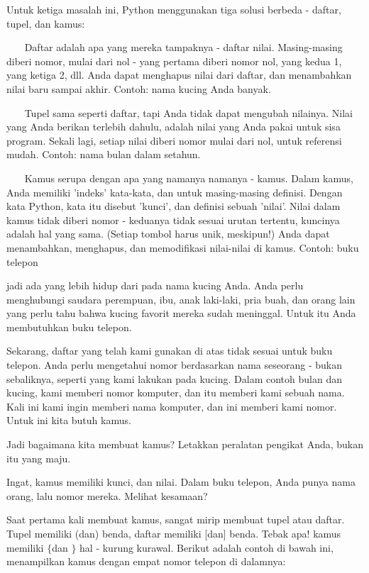 \vspace{12pt}
Untuk ketiga masalah ini, Python menggunakan tiga solusi berbeda - daftar, tupel, dan kamus: \par
\vspace{12pt}
~~~ Daftar adalah apa yang mereka tampaknya - daftar nilai. Masing-masing diberi nomor, mulai dari nol - yang pertama diberi nomor nol, yang kedua 1, yang ketiga 2, dll. Anda dapat menghapus nilai dari daftar, dan menambahkan nilai baru sampai akhir. Contoh: nama kucing Anda banyak. \par
~~~ Tupel sama seperti daftar, tapi Anda tidak dapat mengubah nilainya. Nilai yang Anda berikan terlebih dahulu, adalah nilai yang Anda pakai untuk sisa program. Sekali lagi, setiap nilai diberi nomor mulai dari nol, untuk referensi mudah. Contoh: nama bulan dalam setahun. \par
~~~ Kamus serupa dengan apa yang namanya namanya - kamus. Dalam kamus, Anda memiliki 'indeks' kata-kata, dan untuk masing-masing definisi. Dengan kata Python, kata itu disebut 'kunci', dan definisi sebuah 'nilai'. Nilai dalam kamus tidak diberi nomor - keduanya tidak sesuai urutan tertentu, kuncinya adalah hal yang sama. (Setiap tombol harus unik, meskipun!) Anda dapat menambahkan, menghapus, dan memodifikasi nilai-nilai di kamus. Contoh: buku telepon \par
jadi ada yang lebih hidup dari pada nama kucing Anda. Anda perlu menghubungi saudara perempuan, ibu, anak laki-laki, pria buah, dan orang lain yang perlu tahu bahwa kucing favorit mereka sudah meninggal. Untuk itu Anda membutuhkan buku telepon. \par
\vspace{12pt}
Sekarang, daftar yang telah kami gunakan di atas tidak sesuai untuk buku telepon. Anda perlu mengetahui nomor berdasarkan nama seseorang - bukan sebaliknya, seperti yang kami lakukan pada kucing. Dalam contoh bulan dan kucing, kami memberi nomor komputer, dan itu memberi kami sebuah nama. Kali ini kami ingin memberi nama komputer, dan ini memberi kami nomor. Untuk ini kita butuh kamus. \par
\vspace{12pt}
Jadi bagaimana kita membuat kamus? Letakkan peralatan pengikat Anda, bukan itu yang maju. \par
\vspace{12pt}
Ingat, kamus memiliki kunci, dan nilai. Dalam buku telepon, Anda punya nama orang, lalu nomor mereka. Melihat kesamaan? \par
\vspace{12pt}
Saat pertama kali membuat kamus, sangat mirip membuat tupel atau daftar. Tupel memiliki (dan) benda, daftar memiliki [dan] benda. Tebak apa! kamus memiliki  $  \{  $dan $  \}  $ hal - kurung kurawal. Berikut adalah contoh di bawah ini, menampilkan kamus dengan empat nomor telepon di dalamnya: \par
